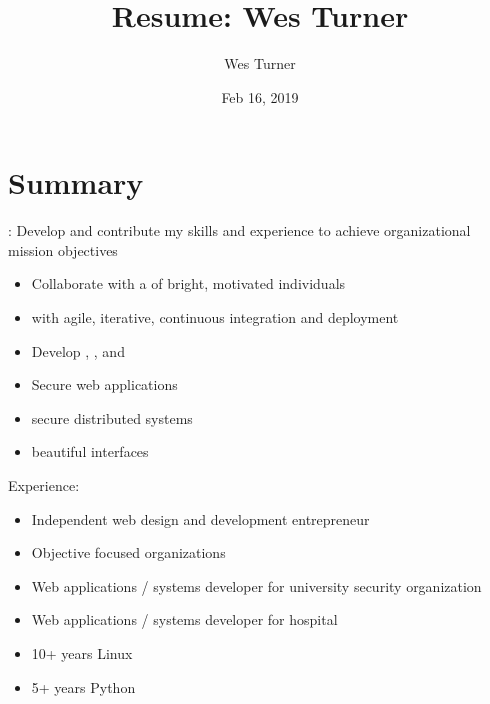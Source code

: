 \documentclass[letter,,openany,oneside,english]{sphinxhowto}
\title{Resume: Wes Turner}
\date{Feb 16, 2019}
\author{Wes Turner}
\begin{document}
\maketitle
\sphinxtableofcontents
{}\label{\detokenize{resume::doc}}

\newpage

\section{Summary}
\label{\detokenize{resume:summary}}\label{\detokenize{resume:id1}}

: Develop and contribute my skills and experience to
achieve organizational mission objectives

\begin{itemize}
\item {} 
Collaborate with a  of bright, motivated individuals

\item {} 
 with agile, iterative, continuous integration and deployment

\item {} 
Develop , , and 

\item {} 
Secure web applications

\item {} 
 secure distributed systems

\item {} 
 beautiful interfaces

\end{itemize}

Experience:
\begin{itemize}
\item {} 
Independent web design and development entrepreneur

\item {} 
Objective focused organizations

\item {} 
Web applications / systems developer for university security organization

\item {} 
Web applications / systems developer for hospital

\item {} 
10+ years Linux

\item {} 
5+ years Python

\end{itemize}
\newpage
\end{document}
